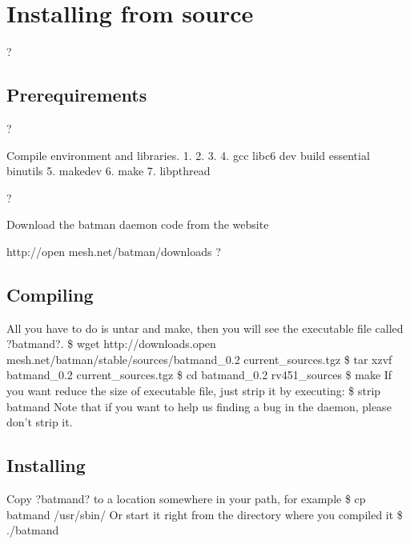 \documentclass[
	12pt,
	a4paper,
	twoside,
	english,
	headsepline,
	footnosepline,
	automark,
	normalheadings,
	openany,
	cleardoubleplain,
	abstracton,
	idxtotoc,
	liststotoc,
	bibtotoc,
 	BCOR8mm,
]{scrartcl}
\title{\dctitle}
\author{\dcauthorfirstname~\dcauthorlastname}
\begin{document}
\maketitle

\begin{abstract}
 B.A.T.M.A.N stands for ``better approach to mobile ad hoc networking'', this is a new  routing protocol for multi-hop ad-hoc mesh networks. Go to \url{http://www.open-mesh.net} to see  more information.

The following document will explain how to install and use the batman daemon.
\end{abstract}

\section{Installing from source}
?

\subsection{Prerequirements}
?

Compile environment and libraries. 1. 2. 3. 4. gcc  libc6 dev build essential  binutils 5. makedev 6. make 7. libpthread

?

Download the batman daemon code from the website

 http://open mesh.net/batman/downloads
?

\subsection{Compiling}
All you have to do is untar and make, then you will see the executable file called ?batmand?. \$ wget http://downloads.open mesh.net/batman/stable/sources/batmand\_0.2  current\_sources.tgz \$ tar xzvf batmand\_0.2 current\_sources.tgz \$ cd batmand\_0.2 rv451\_sources \$ make If you want reduce the size of executable file, just strip it by executing:  \$ strip batmand Note that if you want to help us finding a bug in the daemon, please don't strip it.

\subsection{Installing}
Copy ?batmand? to a location somewhere in your path, for example \$ cp batmand /usr/sbin/ Or start it right from the directory where you compiled it \$ ./batmand
\end{document}
